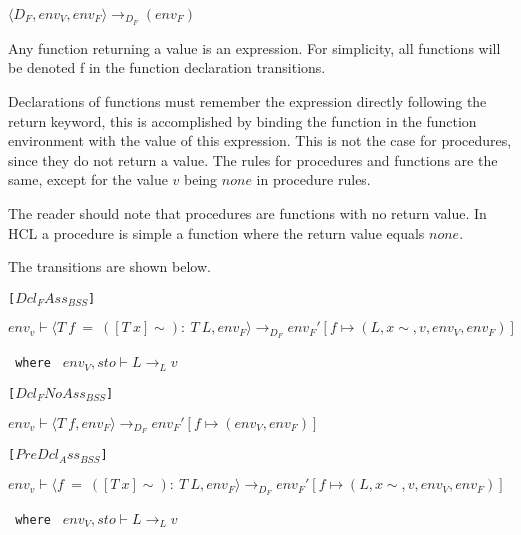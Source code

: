 \begin{center}
	$\langle D_F, env_V, env_F \rangle \rightarrow_{D_F} (env_F)$
\end{center}

Any function returning a value is an expression.
For simplicity, all functions will be denoted f in the function declaration transitions.

Declarations of functions must remember the expression directly following the return keyword, this is accomplished by binding the function in the function environment with the value of this expression.
This is not the case for procedures, since they do not return a value.
The rules for procedures and functions are the same, except for the value $v$ being $none$ in procedure rules.

The reader should note that procedures are functions with no return value.
In HCL a procedure is simple a function where the return value equals $none$.

The transitions are shown below.

\texttt{[$Dcl_FAss_{BSS}$]}\\
\begin{center}
	\begin{math}
			{env_v \vdash \langle T\ f\ =\ ([T\ x]\sim):\ T\ L,env_F \rangle \rightarrow_{D_F} env_F'[f \mapsto (L, x\sim, v, env_V, env_F)]}
	\end{math}
	
	\texttt{ where } $env_V, sto \vdash L \rightarrow_L v$
\end{center}

\texttt{[$Dcl_FNoAss_{BSS}$]}\\
\begin{center}
	\begin{math}
	{env_v \vdash \langle T\ f,env_F \rangle \rightarrow_{D_F} env_F'[f \mapsto (env_V, env_F)]}
	\end{math}
\end{center}

\texttt{[$PreDcl_Ass_{BSS}$]}\\
\begin{center}
	\begin{math}
	{env_v \vdash \langle f\ =\ ([T\ x]\sim):\ T\ L,env_F \rangle \rightarrow_{D_F} env_F'[f \mapsto (L, x\sim, v, env_V, env_F)]}
	\end{math}
	
	\texttt{ where } $env_V, sto \vdash L \rightarrow_L v$
\end{center}


